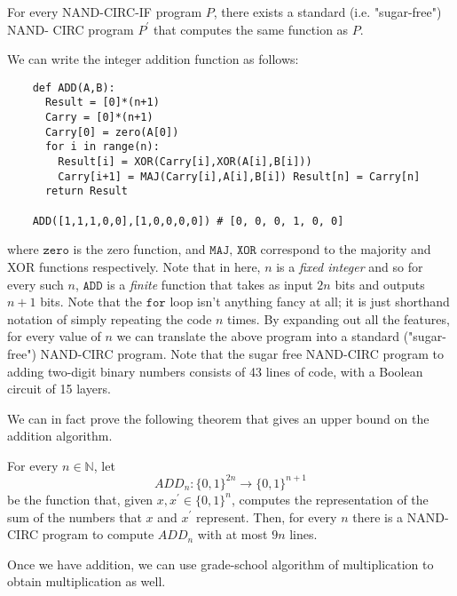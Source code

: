   \begin{theorem}
    For every NAND-CIRC-IF program $P$, there exists a standard (i.e. "sugar-free") NAND- CIRC program $P^\prime$ that computes the same function as $P$. 
  \end{theorem}

  We can write the integer addition function as follows: 

  \begin{lstlisting}
    def ADD(A,B):
      Result = [0]*(n+1) 
      Carry = [0]*(n+1) 
      Carry[0] = zero(A[0]) 
      for i in range(n):
        Result[i] = XOR(Carry[i],XOR(A[i],B[i]))
        Carry[i+1] = MAJ(Carry[i],A[i],B[i]) Result[n] = Carry[n]
      return Result
        
    ADD([1,1,1,0,0],[1,0,0,0,0]) # [0, 0, 0, 1, 0, 0]
  \end{lstlisting}

  where $\texttt{zero}$ is the zero function, and $\texttt{MAJ, XOR}$ correspond to the majority and XOR functions respectively. Note that in here, $n$ is a \textit{fixed integer} and so for every such $n$, $\texttt{ADD}$ is a \textit{finite} function that takes as input $2n$ bits and outputs $n+1$ bits. Note that the $\texttt{for}$ loop isn't anything fancy at all; it is just shorthand notation of simply repeating the code $n$ times. By expanding out all the features, for every value of $n$ we can translate the above program into a standard ("sugar-free") NAND-CIRC program. Note that the sugar free NAND-CIRC program to adding two-digit binary numbers consists of 43 lines of code, with a Boolean circuit of 15 layers. 

  We can in fact prove the following theorem that gives an upper bound on the addition algorithm. 

  \begin{theorem}
    For every $n \in \mathbb{N}$, let 
    \begin{equation}
      ADD_n : \{0,1\}^{2n} \longrightarrow \{0,1\}^{n+1}
    \end{equation}
    be the function that, given $x, x^\prime \in \{0,1\}^n$, computes the representation of the sum of the numbers that $x$ and $x^\prime$ represent. Then, for every $n$ there is a NAND-CIRC program to compute $ADD_n$ with at most $9n$ lines. 
  \end{theorem}

  Once we have addition, we can use grade-school algorithm of multiplication to obtain multiplication as well. 

